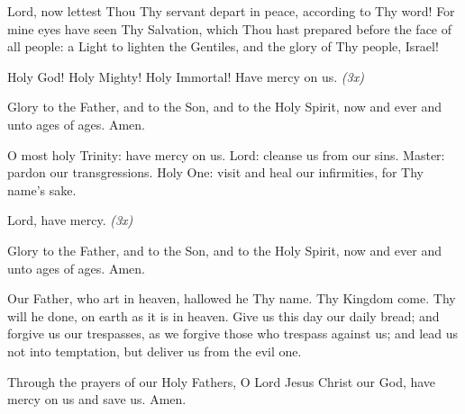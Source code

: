 Lord, now lettest Thou Thy servant depart in peace, according to Thy word! For mine eyes have seen Thy Salvation, which Thou hast prepared before the face of all people: a Light to lighten the Gentiles, and the glory of Thy people, Israel!

Holy God! Holy Mighty! Holy Immortal! Have mercy on us. \textit{(3x)}

Glory to the Father, and to the Son, and to the Holy Spirit, now and ever and unto ages of ages. Amen.

O most holy Trinity: have mercy on us. Lord: cleanse us from our sins. Master: pardon our transgressions. Holy One: visit and heal our infirmities, for Thy name's sake.

Lord, have mercy. \textit{(3x)}

Glory to the Father, and to the Son, and to the Holy Spirit, now and ever and unto ages of ages. Amen.

Our Father, who art in heaven, hallowed he Thy name. Thy Kingdom come. Thy will he done, on earth as it is in heaven. Give us this day our daily bread; and forgive us our trespasses, as we forgive those who trespass against us; and lead us not into temptation, but deliver us from the evil one. 

Through the prayers of our Holy Fathers, O Lord Jesus Christ our God, have mercy on us and save us. Amen.